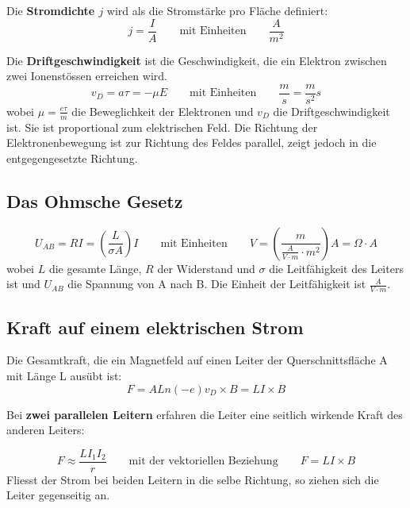 \documentclass[11pt]{article}
\begin{document}
Die \textbf{Stromdichte $j$} wird als die Stromst{\"a}rke pro Fl{\"a}che definiert:
\begin{equation*}
	j = \frac{I}{A} \qquad\text{mit Einheiten}\qquad \frac{A}{m^2}
\end{equation*}

Die \textbf{Driftgeschwindigkeit} ist die Geschwindigkeit, die ein Elektron zwischen zwei Ionenst{\"o}ssen erreichen wird.
\begin{equation*}
	v_D = a\tau = -\mu E \qquad\text{mit Einheiten}\qquad \frac{m}{s} = \frac{m}{s^2}s
\end{equation*}
wobei $\mu = \frac{e\tau}{m}$ die Beweglichkeit der Elektronen und $v_D$ die Driftgeschwindigkeit ist. Sie ist proportional zum elektrischen Feld. Die Richtung der Elektronenbewegung ist zur Richtung des Feldes parallel, zeigt jedoch in die entgegengesetzte Richtung.

\subsection{Das Ohmsche Gesetz}

\begin{equation*}
	U_{AB} = RI = (\frac{L}{\sigma A})I \qquad\text{mit Einheiten}\qquad V = (\frac{m}{\frac{A}{V \cdot m}\cdot m^2})A = \Omega \cdot A
\end{equation*}
wobei $L$ die gesamte L{\"a}nge, $R$ der Widerstand und $\sigma$ die Leitf{\"a}higkeit des Leiters ist und $U_{AB}$ die Spannung von A nach B. Die Einheit der Leitf{\"a}higkeit ist $\frac{A}{V\cdot m}$.
\subsection{Kraft auf einem elektrischen Strom}

Die Gesamtkraft, die ein Magnetfeld auf einen Leiter der Querschnittsfl{\"a}che A mit L{\"a}nge L aus{\"u}bt ist:
\begin{equation*}
	F = ALn(-e)v_D \times B = LI \times B
\end{equation*}

Bei \textbf{zwei parallelen Leitern} erfahren die Leiter eine seitlich wirkende Kraft des anderen Leiters:

\begin{equation*}
	F \approx \frac{LI_1I_2}{r} \qquad\text{mit der vektoriellen Beziehung}\qquad F = LI \times B
\end{equation*}
Fliesst der Strom bei beiden Leitern in die selbe Richtung, so ziehen sich die Leiter gegenseitig an.
\end{document}
